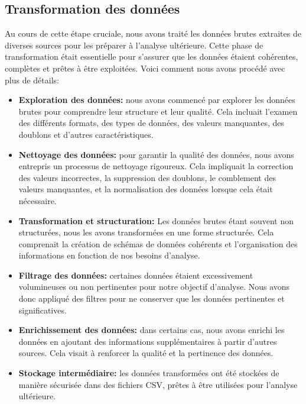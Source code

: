         \subsection{Transformation des données}
        \par Au cours de cette étape cruciale, nous avons traité les données brutes extraites de diverses sources pour les préparer à l'analyse ultérieure. Cette phase de transformation était essentielle pour s'assurer que les données étaient cohérentes, complètes et prêtes à être exploitées. Voici comment nous avons procédé avec plus de détails:
        \begin{itemize}
            \item \textbf{Exploration des données:} nous avons commencé par explorer les données brutes pour comprendre leur structure et leur qualité. Cela incluait l'examen des différents formats, des types de données, des valeurs manquantes, des doublons et d'autres caractéristiques.
        
            \item \textbf{Nettoyage des données:} pour garantir la qualité des données, nous avons entrepris un processus de nettoyage rigoureux. Cela impliquait la correction des valeurs incorrectes, la suppression des doublons, le comblement des valeurs manquantes, et la normalisation des données lorsque cela était nécessaire.
            \item \textbf{Transformation et structuration:} Les données brutes étant souvent non structurées, nous les avons transformées en une forme structurée. Cela comprenait la création de schémas de données cohérents et l'organisation des informations en fonction de nos besoins d'analyse.
            \item \textbf{Filtrage des données:} certaines données étaient excessivement volumineuses ou non pertinentes pour notre objectif d'analyse. Nous avons donc appliqué des filtres pour ne conserver que les données pertinentes et significatives.

            \item \textbf{Enrichissement des données:} dans certains cas, nous avons enrichi les données en ajoutant des informations supplémentaires à partir d'autres sources. Cela visait à renforcer la qualité et la pertinence des données.
            \item \textbf{Stockage intermédiaire:} les données transformées ont été stockées de manière sécurisée dans des fichiers CSV, prêtes à être utilisées pour l'analyse ultérieure.


\end{itemize}
